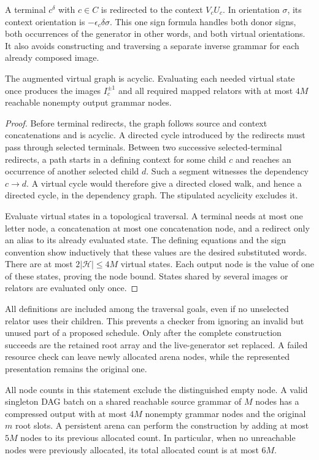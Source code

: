 A terminal $c^\delta$ with $c\in C$ is redirected to the context
$V_cU_c$. In orientation $\sigma$, its context orientation is
$-\epsilon_c\delta\sigma$. This one sign formula handles both donor
signs, both occurrences of the generator in other words, and both
virtual orientations. It also avoids constructing and traversing a
separate inverse grammar for each already composed image.

\begin{lemma}
\label{alg:signed}
The augmented virtual graph is acyclic. Evaluating each needed virtual
state once produces the images $I_c^{\pm1}$ and all required mapped
relators with at most $4M$ reachable nonempty output grammar nodes.
\end{lemma}

\begin{proof}
Before terminal redirects, the graph follows source and context
concatenations and is acyclic. A directed cycle introduced by the
redirects must pass through selected terminals. Between two successive
selected-terminal redirects, a path starts in a defining context for
some child $c$ and reaches an occurrence of another selected child $d$.
Such a segment witnesses the dependency $c\to d$. A virtual cycle
would therefore give a directed closed walk, and hence a directed
cycle, in the dependency graph. The stipulated acyclicity excludes it.

Evaluate virtual states in a topological traversal. A terminal needs
at most one letter node, a concatenation at most one concatenation
node, and a redirect only an alias to its already evaluated state.
The defining equations and the sign convention show inductively that
these values are the desired substituted words. There are at most
$2|\mathcal H|\le4M$ virtual states. Each output node is the value of
one of these states, proving the node bound. States shared by several
images or relators are evaluated only once.
\end{proof}

All definitions are included among the traversal goals, even if no
unselected relator uses their children. This prevents a checker from
ignoring an invalid but unused part of a proposed schedule. Only after
the complete construction succeeds are the retained root array and
the live-generator set replaced. A failed resource check can leave
newly allocated arena nodes, while the represented presentation
remains the original one.

\begin{theorem}
\label{alg:linear-size}
All node counts in this statement exclude the distinguished empty node.
A valid singleton DAG batch on a shared reachable source grammar of
$M$ nodes has a compressed output with at most $4M$ nonempty grammar
nodes and the original $m$ root slots. A persistent arena can perform
the construction by adding at most $5M$ nodes to its previous allocated
count. In particular, when no unreachable nodes were previously
allocated, its total allocated count is at most $6M$.
\end{theorem}


